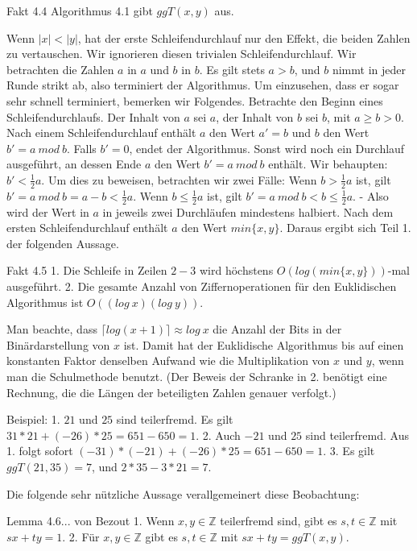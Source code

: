 \documentclass[a4paper]{article}
\begin{document}
\begin{multicols}{3}
        Fakt 4.4 Algorithmus 4.1 gibt $ggT(x,y)$ aus.

        Wenn $|x|<|y|$, hat der erste Schleifendurchlauf nur den Effekt, die beiden Zahlen zu vertauschen. Wir ignorieren diesen trivialen Schleifendurchlauf. Wir betrachten die Zahlen $a$ in $a$ und $b$ in $b$. Es gilt stets $a>b$, und $b$ nimmt in jeder Runde strikt ab, also terminiert der Algorithmus. Um einzusehen, dass er sogar sehr schnell terminiert, bemerken wir Folgendes. Betrachte den Beginn eines Schleifendurchlaufs. Der Inhalt von $a$ sei $a$, der Inhalt von $b$ sei $b$, mit $a\geq b >0$. Nach einem Schleifendurchlauf enthält $a$ den Wert $a′=b$ und $b$ den Wert $b′=a\ mod\ b$. Falls $b′=0$, endet der Algorithmus. Sonst wird noch ein Durchlauf ausgeführt, an dessen Ende $a$ den Wert $b′=a\ mod\ b$ enthält. Wir behaupten: $b′<\frac{1}{2} a$. Um dies zu beweisen, betrachten wir zwei Fälle: Wenn $b>\frac{1}{2} a$ ist, gilt $b′=a\ mod\ b=a-b<\frac{1}{2} a$. Wenn $b\leq\frac{1}{2} a$ ist, gilt $b′=a\ mod\ b < b\leq\frac{1}{2} a$. - Also wird der Wert in $a$ in jeweils zwei Durchläufen mindestens halbiert. Nach dem ersten Schleifendurchlauf enthält $a$ den Wert $min\{x,y\}$. Daraus ergibt sich Teil 1. der folgenden Aussage.

        Fakt 4.5
        1. Die Schleife in Zeilen $2-3$ wird höchstens $O(log(min\{x,y\}))$-mal ausgeführt.
        2. Die gesamte Anzahl von Ziffernoperationen für den Euklidischen Algorithmus ist $O((log\ x)(log\ y))$.

        Man beachte, dass $\lceil log(x+1)\rceil\approx log\ x$ die Anzahl der Bits in der Binärdarstellung von $x$ ist. Damit hat der Euklidische Algorithmus bis auf einen konstanten Faktor denselben Aufwand wie die Multiplikation von $x$ und $y$, wenn man die Schulmethode benutzt. (Der Beweis der Schranke in 2. benötigt eine Rechnung, die die Längen der beteiligten Zahlen genauer verfolgt.)

        Beispiel:
        1. $21$ und $25$ sind teilerfremd. Es gilt $31*21 + (-26)*25 = 651-650 = 1$.
        2. Auch $-21$ und $25$ sind teilerfremd. Aus 1. folgt sofort $(-31)*(-21) + (-26)*25 =651 -650 = 1$.
        3. Es gilt $ggT(21,35) = 7$, und $2* 35 - 3 *21 = 7$.

        Die folgende sehr nützliche Aussage verallgemeinert diese Beobachtung:

        Lemma 4.6... von Bezout
        1. Wenn $x,y\in\mathbb{Z}$ teilerfremd sind, gibt es $s,t\in\mathbb{Z}$ mit $sx+ty= 1$.
        2. Für $x,y\in\mathbb{Z}$ gibt es $s,t\in\mathbb{Z}$ mit $sx+ty= ggT(x,y)$.


\end{multicols}
\end{document}

